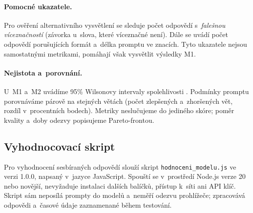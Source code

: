 \documentclass[11pt,a4paper]{article}
\begin{document}
\paragraph{Pomocné ukazatele.}
Pro ověření alternativního vysvětlení se sleduje počet odpovědí
s~\emph{falešnou víceznačností} (závorka u~slova, které víceznačné
není). Dále se uvádí počet odpovědí porušujících formát a~délka
promptu ve znacích. Tyto ukazatele nejsou samostatnými metrikami,
pomáhají však vysvětlit výsledky M1.

\paragraph{Nejistota a~porovnání.}
U~M1 a~M2 uvádíme 95\% Wilsonovy intervaly spolehlivosti
\cite{wilson1927}. Podmínky promptu porovnáváme párově na stejných
větách (počet zlepšených a~zhoršených vět, rozdíl v~procentních
bodech). Metriky neslučujeme do jediného skóre; poměr kvality a~doby
odezvy popisujeme Pareto-frontou.

\subsection{Vyhodnocovací skript}
\label{sec:hodnotici-skript}

Pro vyhodnocení sesbíraných odpovědí slouží skript
\texttt{hodnoceni\_modelu.js} ve verzi 1.0.0, napsaný v~jazyce
JavaScript. Spouští se v~prostředí Node.js verze 20 nebo novější,
nevyžaduje instalaci dalších balíčků, přístup k~síti ani API klíč.
Skript sám neposílá prompty do modelů a~neměří odezvu prohlížeče;
zpracovává odpovědi a~časové údaje zaznamenané během testování.
\end{document}
